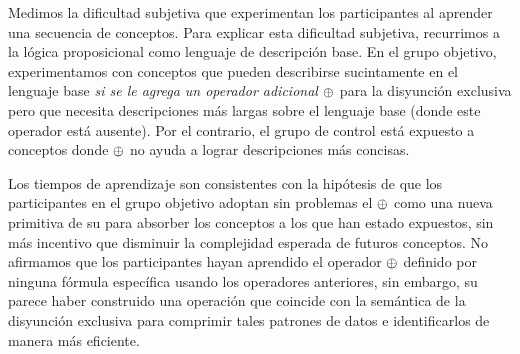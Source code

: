 Medimos la dificultad subjetiva que experimentan los participantes al aprender una secuencia de conceptos. Para explicar esta dificultad subjetiva, recurrimos a la lógica proposicional como lenguaje de descripción base. En el grupo objetivo, experimentamos con conceptos que pueden describirse sucintamente en el lenguaje base {\em si se le agrega un operador adicional $ \oplus $} para la disyunción exclusiva pero que necesita descripciones más largas sobre el lenguaje base (donde este operador está ausente). Por el contrario, el grupo de control está expuesto a conceptos donde $ \oplus $ no ayuda a lograr descripciones más concisas.

Los tiempos de aprendizaje son consistentes con la hipótesis de que los participantes en el grupo objetivo adoptan sin problemas el $ \oplus $ como una nueva primitiva de su \lot para absorber los conceptos a los que han estado expuestos, sin más incentivo que disminuir la complejidad esperada de futuros conceptos. No afirmamos que los participantes hayan aprendido el operador $ \oplus $ definido por ninguna fórmula específica usando los operadores anteriores, sin embargo, su \lot parece haber construido una operación que coincide con la semántica de la disyunción exclusiva para comprimir tales patrones de datos e identificarlos de manera más eficiente.

